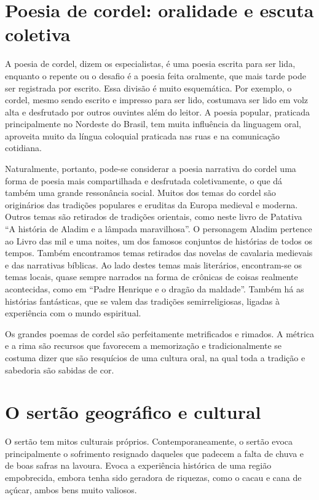 \documentclass[11pt]{hedrabook_ficha}
\begin{document}
\section{Poesia de cordel: oralidade e escuta coletiva} 

A poesia de cordel, dizem os especialistas, é uma poesia escrita para ser lida,
enquanto o repente ou o desafio é a poesia feita oralmente, que mais tarde pode
ser registrada por escrito. Essa divisão é muito esquemática. Por exemplo, o
cordel, mesmo sendo escrito e impresso para ser lido, costumava ser lido em
volz alta e desfrutado por outros ouvintes além do leitor. A poesia popular,
praticada principalmente no Nordeste do Brasil, tem muita influência da
linguagem oral, aproveita muito da língua coloquial praticada nas ruas e na
comunicação cotidiana. 

Naturalmente, portanto, pode-se considerar a poesia narrativa do cordel uma
forma de poesia mais compartilhada e desfrutada coletivamente, o que dá também
uma grande ressonância social. Muitos dos temas do cordel são originários das
tradições populares e eruditas da Europa medieval e moderna. Outros temas são
retirados de tradições orientais, como neste livro de Patativa “A história de
Aladim e a lâmpada maravilhosa”. O personagem Aladim pertence ao Livro das mil
e uma noites, um dos famosos conjuntos de histórias de todos os tempos. Também
encontramos temas retirados das novelas de cavalaria medievais e das narrativas
bíblicas. Ao lado destes temas mais literários, encontram-se os temas locais,
quase sempre narrados na forma de crônicas de coisas realmente acontecidas,
como em “Padre Henrique e o dragão da maldade”. Também há as histórias
fantásticas, que se valem das tradições semirreligiosas, ligadas à experiência
com o mundo espiritual. 

Os grandes poemas de cordel são perfeitamente metrificados e rimados. A métrica
e a rima são recursos que favorecem a memorização e tradicionalmente se costuma
dizer que são resquícios de uma cultura oral, na qual toda a tradição e
sabedoria são sabidas de cor.  


\section{O sertão geográfico e cultural}

O sertão tem mitos culturais próprios. Contemporaneamente, o sertão evoca
principalmente o sofrimento resignado daqueles que padecem a falta de chuva e
de boas safras na lavoura. Evoca a experiência histórica de uma região
empobrecida, embora tenha sido geradora de riquezas, como o cacau e cana de
açúcar, ambos bens muito valiosos. 
\end{document}
